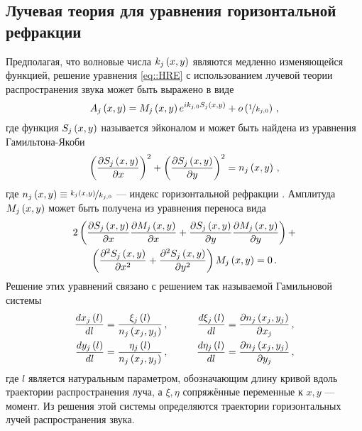 \documentclass[../document.tex]{subfiles}
\begin{document}
		\subsection{Лучевая теория для уравнения горизонтальной рефракции}
			\par Предполагая, что волновые числа $k_j\left(x,y\right)$ являются медленно изменяющейся функцией, решение уравнения \eqref{eq::HRE} с использованием лучевой теории распространения звука может быть выражено в виде
			\begin{equation}
				A_j\left(x,y\right)=M_j\left(x,y\right)e^{ik_{j,0}S_j\left(x,y\right)}+o\left(\nicefrac{1}{k_{j,0}}\right)\,,
			\end{equation}
			где функция $S_j\left(x,y\right)$ называется эйконалом и может быть найдена из уравнения Гамильтона-Якоби
			\begin{equation}\label{eq::hamilton_jacoby}
				\left(\frac{\partial S_j\left(x,y\right)}{\partial x}\right)^2+\left(\frac{\partial S_j\left(x,y\right)}{\partial y}\right)^2=n_j\left(x,y\right)\,,
			\end{equation}
			где $n_j\left(x,y\right)\equiv \nicefrac{k_j\left(x,y\right)}{k_{j,0}}$ --- индекс горизонтальной рефракции \cite{burridge}. Амплитуда $M_j\left(x,y\right)$ может быть получена из уравнения переноса вида
            \begin{multline}\label{eq::transfer}
                2\left(\frac{\partial S_j\left(x,y\right)}{\partial x}\frac{\partial M_j\left(x,y\right)}{\partial x}+\frac{\partial S_j\left(x,y\right)}{\partial y}\frac{\partial M_j\left(x,y\right)}{\partial y}\right)+\\\left(\frac{\partial^2S_j\left(x,y\right)}{\partial x^2}+\frac{\partial^2S_j\left(x,y\right)}{\partial y^2}\right)M_j\left(x,y\right)=0\,.
            \end{multline}
            Решение этих уравнений связано с решением так называемой Гамильновой системы
			\begin{equation}\label{eq:hamilton_system}
				\begin{aligned}
					\frac{dx_j\left(l\right)}{dl}&=\frac{\xi_j\left(l\right)}{n_j\left(x_j,y_j\right)}\,,\qquad&\frac{d\xi_j\left(l\right)}{dl}&=\frac{\partial n_j\left(x_j,y_j\right)}{\partial x_j}\,,\\
					\frac{dy_j\left(l\right)}{dl}&=\frac{\eta_j\left(l\right)}{n_j\left(x_j,y_j\right)}\,,\qquad&\frac{d\eta_j\left(l\right)}{dl}&=\frac{\partial n_j\left(x_j,y_j\right)}{\partial y_j}\,,\\
				\end{aligned}
			\end{equation}
			где $l$ является натуральным параметром, обозначающим длину кривой вдоль траектории распространения луча, а $\xi,\eta$ сопряжённые переменные к $x,y$ --- момент. Из решения этой системы определяются траектории горизонтальных лучей распространения звука.
\end{document}
